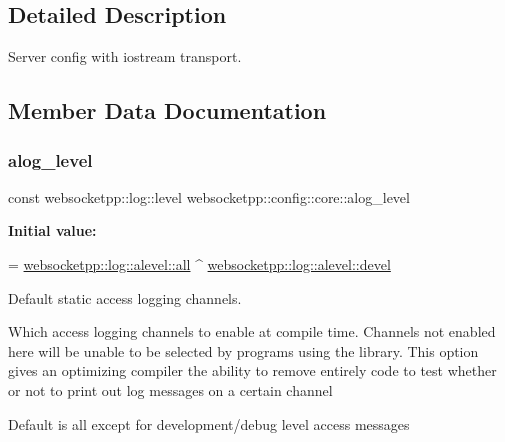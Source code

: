 \subsection{Detailed Description}
Server config with iostream transport. 

\subsection{Member Data Documentation}
\mbox{\label{structwebsocketpp_1_1config_1_1core_abcefa380ef3c250f919ae6a44a9b5724}} 
\subsubsection{\texorpdfstring{alog\+\_\+level}{alog\_level}}
{\footnotesize\ttfamily const websocketpp\+::log\+::level websocketpp\+::config\+::core\+::alog\+\_\+level\hspace{0.3cm}{\ttfamily [static]}}

{\bfseries Initial value\+:}
\begin{DoxyCode}
=
        \mbox{\hyperlink{structwebsocketpp_1_1log_1_1alevel_a853aa0b8976e53f3181af3bc398d493e}{websocketpp::log::alevel::all}} ^ 
      \mbox{\hyperlink{structwebsocketpp_1_1log_1_1alevel_a65ec21c75999c993c25c72569018f576}{websocketpp::log::alevel::devel}}
\end{DoxyCode}


Default static access logging channels. 

Which access logging channels to enable at compile time. Channels not enabled here will be unable to be selected by programs using the library. This option gives an optimizing compiler the ability to remove entirely code to test whether or not to print out log messages on a certain channel

Default is all except for development/debug level access messages \mbox{\label{structwebsocketpp_1_1config_1_1core_af3b087e00d7793c8ae291566f8988375}} 
